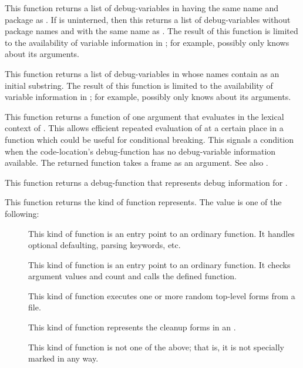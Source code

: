 {
This function returns a list of debug-variables in  having
the same name and package as .  If  is uninterned, then
this returns a list of debug-variables without package names and with the same
name as .  The result of this function is limited to the
availability of variable information in ; for example,
possibly  only knows about its arguments.
\enddefun


This function returns a list of debug-variables in  whose
names contain  as an initial substring.  The result of
this function is limited to the availability of variable information in
; for example, possibly  only knows
about its arguments.
\enddefun


This function returns a function of one argument that evaluates  in
the lexical context of .  This allows efficient
repeated evaluation of  at a certain place in a function which could
be useful for conditional breaking.  This signals a 
condition when the code-location's debug-function has no debug-variable
information available.  The returned function takes a frame as an
argument.  See also .
\enddefun


This function returns a debug-function that represents debug information for
.
\enddefun


This function returns the kind of function  represents.
The value is one of the following:
\begin{description}
\item[]
This kind of function is an entry point to an ordinary function.  It handles
optional defaulting, parsing keywords, etc.
\item[]
This kind of function is an entry point to an ordinary function.  It checks
argument values and count and calls the defined function.
\item[]
This kind of function executes one or more random top-level forms
from a file.
\item[]
This kind of function represents the cleanup forms in an .
\item[\nil]
This kind of function is not one of the above; that is, it is not specially
marked in any way.
\end{description}
\enddefun


}
